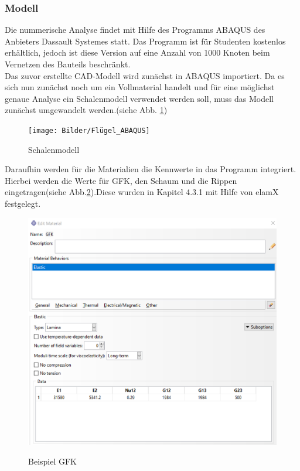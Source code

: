 
\subsubsection{Modell}
Die nummerische Analyse findet mit Hilfe des Programms ABAQUS des Anbieters Dassault Systemes statt. Das Programm ist für Studenten kostenlos erhältlich, jedoch ist diese Version auf eine Anzahl von 1000 Knoten beim Vernetzen des Bauteils beschränkt.\\
Das zuvor erstellte CAD-Modell wird zunächst in ABAQUS importiert. Da es sich nun zunächst noch um ein Vollmaterial handelt und für eine möglichst genaue Analyse ein Schalenmodell verwendet werden soll, muss das Modell zunächst umgewandelt werden.(siehe Abb. \ref{Schalenmodell})

\begin{figure}[h]
 \centering
 \texttt{[image: Bilder/Flügel\_ABAQUS]}
 \label{Schalenmodell}
 \caption{Schalenmodell}
\end{figure}
\newpage

Daraufhin werden für die Materialien die Kennwerte in das Programm integriert. Hierbei werden die Werte für GFK, den Schaum und die Rippen eingetragen(siehe Abb.\ref{Material}).Diese wurden in Kapitel 4.3.1 mit Hilfe von elamX festgelegt.
\begin{figure}[h]
 \centering
 \includegraphics[scale=0.4]{Bilder/Material_GFK}
 \label{Material}
 \caption{Beispiel GFK}
\end{figure}
\newpage

